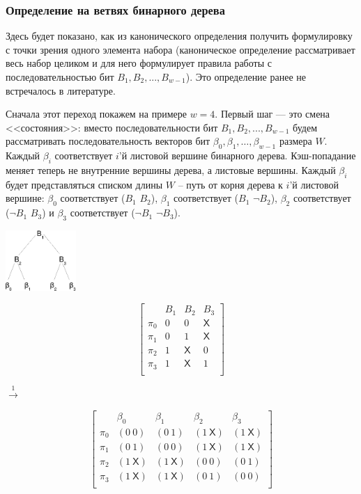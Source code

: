 \subsubsection{Определение \PseudoLRU на ветвях бинарного
дерева}\label{PseudoLRUonBranches}

Здесь будет показано, как из канонического определения \PseudoLRU
получить формулировку \PseudoLRU с точки зрения одного элемента
набора (каноническое определение рассматривает весь набор целиком и
для него формулирует правила работы с последовательностью бит $B_1,
B_2, ..., B_{w{-}1}$). Это определение ранее не встречалось в
литературе.

Сначала этот переход покажем на примере $w=4$. Первый шаг --- это
смена <<состояния>>: вместо последовательности бит $B_1, B_2, ...,
B_{w-1}$ будем рассматривать последовательность векторов бит
$\beta_0, \beta_1, \dots, \beta_{w-1}$ размера $W$. Каждый $\beta_i$
соответствует $i$'й листовой вершине бинарного дерева. Кэш-попадание
меняет теперь не внутренние вершины дерева, а листовые вершины.
Каждый $\beta_i$ будет представляться списком длины $W$ -- путь от
корня дерева к $i$'й листовой вершине: $\beta_0$ соответствует
($B_1$ $B_2$), $\beta_1$ соответствует ($B_1$ $\neg B_2$), $\beta_2$
соответствует ($\neg B_1$ $B_3$) и $\beta_3$ соответствует ($\neg
B_1$ $ \neg
B_3$).\\[0.5cm]

\parbox{0.2\textwidth}{ \centering
  \includegraphics[width=0.2\textwidth]{1.review/btree}
}
\parbox{0.25\textwidth}{
$$ \left[
  \begin{array}{c|ccc}
          & B_1 & B_2 & B_3 \\ \hline
    \pi_0 & 0 & 0 & \textsf{X} \\
    \pi_1 & 0 & 1 & \textsf{X} \\
    \pi_2 & 1 & \textsf{X} & 0 \\
    \pi_3 & 1 & \textsf{X} & 1 \\
  \end{array}
\right]
$$
} $\stackrel{1}{\longrightarrow}$ %
\parbox{0.4\textwidth}{
$$ \left[
  \begin{array}{c|cccc}
          & \beta_0 & \beta_1 & \beta_2 & \beta_3 \\ \hline
    \pi_0 & (0~0) & (0~1) & (1~\textsf{X}) & (1~\textsf{X}) \\
    \pi_1 & (0~1) & (0~0) & (1~\textsf{X}) & (1~\textsf{X}) \\
    \pi_2 & (1~\textsf{X}) & (1~\textsf{X}) & (0~0) & (0~1) \\
    \pi_3 & (1~\textsf{X}) & (1~\textsf{X}) & (0~1) & (0~0) \\
  \end{array}
\right]
$$
}

